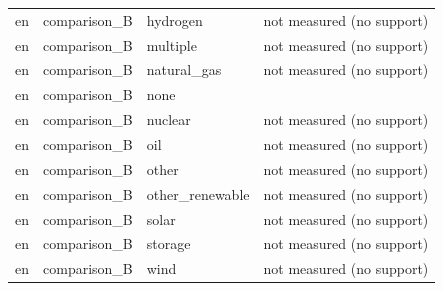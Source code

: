 \begin{longtable}{>{\raggedright\arraybackslash}p{91.6pt}>{\raggedright\arraybackslash}p{92.2pt}>{\raggedright\arraybackslash}p{95.1pt}>{\raggedright\arraybackslash}p{128.1pt}}
en & comparison\_\allowbreak{}B & hydrogen & not measured (no support) \\
en & comparison\_\allowbreak{}B & multiple & not measured (no support) \\
en & comparison\_\allowbreak{}B & natural\_\allowbreak{}gas & not measured (no support) \\
en & comparison\_\allowbreak{}B & none & 0.000 \\
en & comparison\_\allowbreak{}B & nuclear & not measured (no support) \\
en & comparison\_\allowbreak{}B & oil & not measured (no support) \\
en & comparison\_\allowbreak{}B & other & not measured (no support) \\
en & comparison\_\allowbreak{}B & other\_\allowbreak{}renewable & not measured (no support) \\
en & comparison\_\allowbreak{}B & solar & not measured (no support) \\
en & comparison\_\allowbreak{}B & storage & not measured (no support) \\
en & comparison\_\allowbreak{}B & wind & not measured (no support) \\
\end{longtable}
\endgroup
